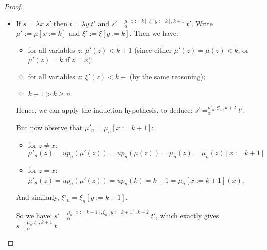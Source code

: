 \documentclass{lmcs}
\theoremstyle{theorem}\newtheorem{theorem}{Theorem}
\theoremstyle{theorem}\newtheorem{lemma}[theorem]{Lemma}
\theoremstyle{theorem}\newtheorem{corollary}[theorem]{Corollary}
\theoremstyle{definition}\newtheorem{definition}[theorem]{Definition}
\theoremstyle{definition}\newtheorem{example}[theorem]{Example}
\newcommand{\Vfree}{\mathcal{V}_{\mathit{nonb}}}
\newcommand{\Vbound}{\mathcal{V}_{\mathit{binder}}}
\newcommand{\identifier}[1]{\mathtt{#1}}
\newcommand{\afun}{\identifier{f}}
\newcommand{\avar}{x}
\newcommand{\bvar}{y}
\newcommand{\Avar}{X}
\newcommand{\abs}[2]{\lambda #1.#2}
\newcommand{\meta}[2]{#1\langle#2\rangle}
\newcommand{\tuple}[2]{\llparenthesis #1,\dots,#2 \rrparenthesis}
\begin{document}
\begin{proof}
\begin{itemize}
\item If $s = \abs{x}{s'}$ then $t = \abs{y}{t'}$ and $s' =_\alpha^{\mu[x:=k],
  \xi[y:=k],k+1} t'$.
  Write $\mu' := \mu[x:=k]$ and $\xi' := \xi[y:=k]$. Then we have:
  \begin{itemize}
  \item for all variables $z$: $\mu'(z) < k+1$ (since either $\mu'(z) = \mu(z)
    < k$, or $\mu'(z) = k$ if $z = x$);
  \item for all variables $z$: $\xi'(z) < k+$ (by the same reasoning);
  \item $k+1 > k \geq n$. \\
  \end{itemize}
  Hence, we can apply the induction hypothesis, to deduce: $s' =_\alpha^{\mu'_n,
  \xi'_n,k+2} t'$.

  But now observe that $\mu'_n = \mu_n[x:=k+1]$:
  \begin{itemize}
  \item for $z \neq x$: $\mu'_n(z) = \mathit{up}_n(\mu'(z)) =
    \mathit{up}_n(\mu(z)) = \mu_n(z) = \mu_n(z)[x:=k+1]$
  \item for $z = x$: $\mu'_n(z) = \mathit{up}_n(\mu'(z)) = \mathit{up}_n(k) =
    k+1 = \mu_n[x:=k+1](x)$. \\
  \end{itemize}
  And similarly, $\xi'_n = \xi_n[y:=k+1]$.

  So we have: $s' =_\alpha^{\mu_n[x:=k+1],\xi_n[y:=k+1],k+2} t'$, which
  exactly gives $s =_\alpha^{\mu_n,\xi_n,k+1} t$.
  \qedhere
\end{itemize}
\end{proof}
\end{document}
